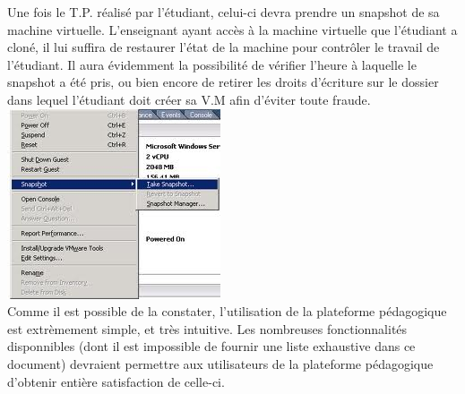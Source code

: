 Une fois le T.P. réalisé par l’étudiant, celui-ci devra prendre un snapshot de sa machine virtuelle. L’enseignant ayant accès à la machine virtuelle que l’étudiant a cloné, il lui suffira de restaurer l’état de la machine pour contrôler le travail de l’étudiant. Il aura évidemment la possibilité de vérifier l’heure à laquelle le snapshot a été pris, ou bien encore de retirer les droits d’écriture sur le dossier dans lequel l’étudiant doit créer sa V.M afin d’éviter toute fraude.\\

\includegraphics{snapshot.jpg}\\

Comme il est possible de la constater, l'utilisation de la plateforme pédagogique est extrèmement simple, et très intuitive. Les nombreuses fonctionnalités disponnibles (dont il est impossible de fournir une liste exhaustive dans ce document) devraient permettre aux utilisateurs de la plateforme pédagogique d'obtenir entière satisfaction de celle-ci.